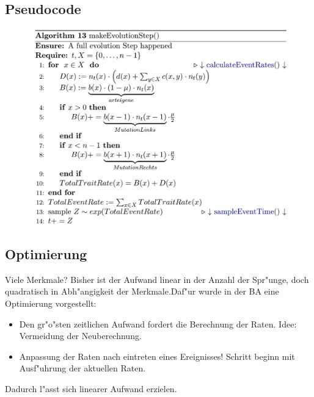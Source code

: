 \documentclass{beamer}
\begin{document}
\subsection{Pseudocode}
\begin{frame}
	\begin{figure}[H]
		\centering
		\includegraphics[width=1\linewidth]{./Pictures/Alg1}
	\end{figure}
\end{frame}

\subsection{Optimierung}
\begin{frame}{Viele Merkmale?}
Bisher ist der Aufwand linear in der Anzahl der Spr"unge, doch quadratisch in Abh"angigkeit der Merkmale.\pause Daf"ur wurde in der BA eine Optimierung vorgestellt:
	\begin{itemize}
		\item Den gr"o"sten zeitlichen Aufwand fordert die Berechnung der Raten. Idee: Vermeidung der Neuberechnung.\pause
		\item Anpassung der Raten nach eintreten eines Ereignisses! Schritt beginn mit Ausf"uhrung der aktuellen Raten.\pause
	\end{itemize}
Dadurch l"asst sich linearer Aufwand erzielen.
\end{frame}
\end{document}
